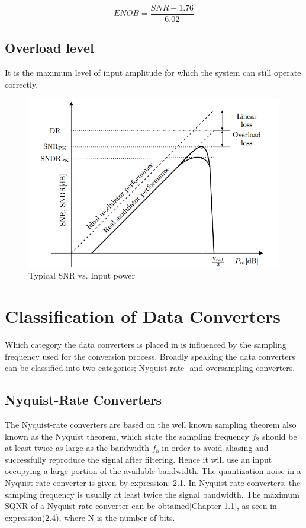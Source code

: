 \begin{equation}
    ENOB = \frac{SNR - 1.76}{6.02}
\end{equation}

\subsection{Overload level}
It is the maximum level of input amplitude for which the system can still operate correctly. 
\begin{figure}[ht]
\centering
\includegraphics[scale=0.5]{images/metrics_snr.png}
\caption{Typical SNR vs. Input power}
\label{fig:metrics}
\end{figure}

\section{Classification of Data Converters}
Which category the data converters is placed in is influenced by the sampling frequency used for the conversion process. Broadly speaking the data converters can be classified into two categories; Nyquist-rate -and oversampling converters\cite{Ovi}.  

\subsection{Nyquist-Rate Converters}
The Nyquist-rate converters are based on the well known sampling theorem also known as the Nyquist theorem, which state the sampling frequency $f_2$ should be at least twice as large as the bandwidth $f_b$ in order to avoid aliasing and successfully reproduce the signal after filtering. Hence it will use an input occupying a large portion of the available bandwidth. The quantization noise in a Nyquist-rate converter is given by expression: 2.1. In Nyquist-rate converters, the sampling frequency is usually at least twice the signal bandwidth. The maximum SQNR of a Nyquist-rate converter can be obtained\cite{Richard}[Chapter 1.1], as seen in expression(2.4), where N is the number of bits.

